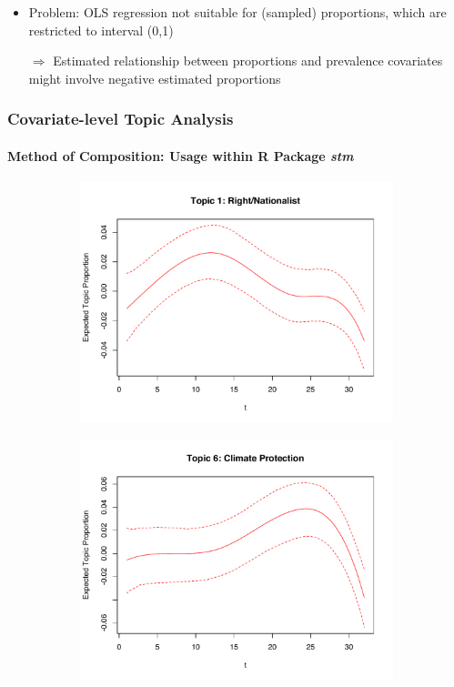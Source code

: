 \documentclass[xcolor=dvipsnames]{beamer}
\begin{document}
\begin{frame}
\begin{itemize}
\item Problem: OLS regression not suitable for (sampled) proportions, which are restricted to interval (0,1)
\item[$\Rightarrow$] Estimated relationship between proportions and prevalence covariates might involve negative estimated proportions
\end{itemize}
\frametitle{Covariate-level Topic Analysis}
\framesubtitle{Method of Composition: Usage within R Package \textit{stm}}
  \begin{figure}[h!]
  \centering
  \captionsetup{justification=centering,margin=2cm}
  \begin{subfigure}[b]{0.4\linewidth}
    \includegraphics[width=\linewidth]{../../plots/presentation/estEffect_topic1.pdf}
  \end{subfigure}
  \begin{subfigure}[b]{0.4\linewidth}
    \includegraphics[width=\linewidth]{../../plots/presentation/estEffect_topic6.pdf}
  \end{subfigure}
\end{figure}
\end{frame}
\end{document}
